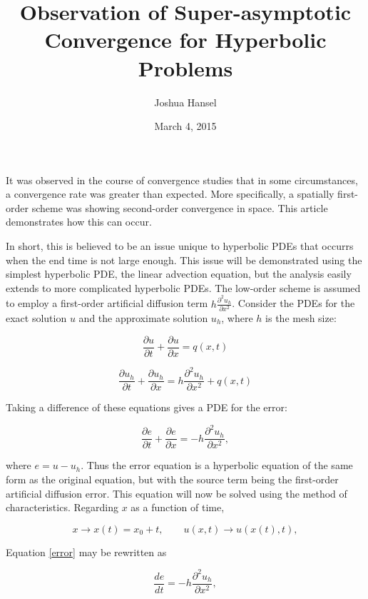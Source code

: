 \documentclass{article}
\author{Joshua Hansel}
\date{March 4, 2015}
\title{Observation of Super-asymptotic Convergence for Hyperbolic Problems}
\begin{document}
\maketitle

It was observed in the course of convergence studies that in some circumstances,
a convergence rate was greater than expected. More specifically, a spatially
first-order scheme was showing second-order convergence in space. This
article demonstrates how this can occur.

In short, this is believed to be an issue unique to hyperbolic PDEs that
occurrs when the end time is not large enough.
This issue will be demonstrated using the simplest hyperbolic PDE, the
linear advection equation, but the analysis easily extends to more complicated
hyperbolic PDEs. The low-order scheme is assumed to employ a first-order
artificial diffusion term $h\frac{\partial^2 u_h}{\partial x^2}$.
Consider the PDEs for the exact solution $u$ and the approximate solution
$u_h$, where $h$ is the mesh size:

\begin{equation}
  \frac{\partial u}{\partial t} + \frac{\partial u}{\partial x} = q(x,t)
\end{equation}

\begin{equation}
  \frac{\partial u_h}{\partial t} + \frac{\partial u_h}{\partial x} = h\frac{\partial^2 u_h}{\partial x^2} + q(x,t)
\end{equation}

\noindent Taking a difference of these equations gives a PDE for the error:

\begin{equation}\label{error}
  \frac{\partial e}{\partial t} + \frac{\partial e}{\partial x} = -h\frac{\partial^2 u_h}{\partial x^2},
\end{equation}

\noindent where $e=u-u_h$. Thus the error equation is a hyperbolic equation of the same form as
the original equation, but with the source term being the first-order artificial diffusion error.
This equation will now be solved using the method of characteristics.
Regarding $x$ as a function of time,

\[
  x\rightarrow x(t)=x_0 + t, \qquad u(x,t)\rightarrow u(x(t),t),
\]

\noindent Equation \ref{error} may be rewritten as

\begin{equation}
  \frac{de}{dt} = -h\frac{\partial^2 u_h}{\partial x^2},
\end{equation}
\end{document}

